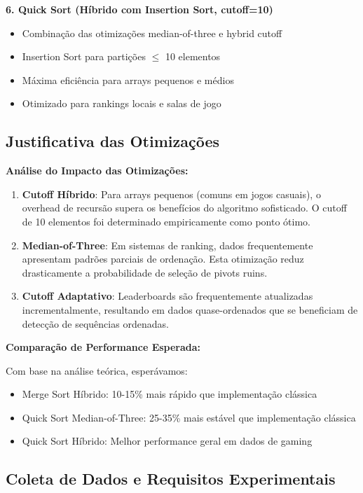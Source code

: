 \documentclass[conference]{IEEEtran}
\begin{document}
\textbf{6. Quick Sort (Híbrido com Insertion Sort, cutoff=10)}
\begin{itemize}
\item Combinação das otimizações median-of-three e hybrid cutoff
\item Insertion Sort para partições $\leq$ 10 elementos
\item Máxima eficiência para arrays pequenos e médios
\item Otimizado para rankings locais e salas de jogo
\end{itemize}

\subsection{Justificativa das Otimizações}

\textbf{Análise do Impacto das Otimizações:}

\begin{enumerate}
\item \textbf{Cutoff Híbrido}: Para arrays pequenos (comuns em jogos casuais), o overhead de recursão supera os benefícios do algoritmo sofisticado. O cutoff de 10 elementos foi determinado empiricamente como ponto ótimo.

\item \textbf{Median-of-Three}: Em sistemas de ranking, dados frequentemente apresentam padrões parciais de ordenação. Esta otimização reduz drasticamente a probabilidade de seleção de pivots ruins.

\item \textbf{Cutoff Adaptativo}: Leaderboards são frequentemente atualizadas incrementalmente, resultando em dados quase-ordenados que se beneficiam de detecção de sequências ordenadas.
\end{enumerate}

\textbf{Comparação de Performance Esperada:}

Com base na análise teórica, esperávamos:
\begin{itemize}
\item Merge Sort Híbrido: 10-15\% mais rápido que implementação clássica
\item Quick Sort Median-of-Three: 25-35\% mais estável que implementação clássica  
\item Quick Sort Híbrido: Melhor performance geral em dados de gaming
\end{itemize}

\subsection{Coleta de Dados e Requisitos Experimentais}
\end{document}
